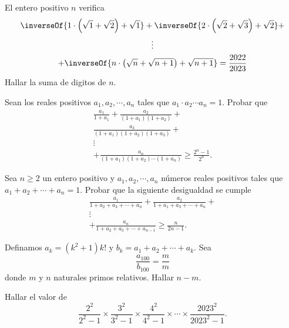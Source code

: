 \begin{section-problem}
    El entero positivo $n$ verifica
    \begin{gather*}
        \inverseOf{1\cdot\left(\sqrt {1} + \sqrt {2}\right) + \sqrt {1}} +
        \inverseOf{2\cdot\left(\sqrt {2} + \sqrt {3}\right) + \sqrt {2}} + \\
        \vdots\\
        + \inverseOf{n\cdot\left(\sqrt {n} + \sqrt {n + 1}\right) + \sqrt {n + 1}} = \frac{2022}{2023}
    \end{gather*}
    Hallar la suma de digitos de $n$.
\end{section-problem}

\begin{section-problem}
    Sean los reales positivos $a_1, a_2, \cdots, a_n$ tales que $a_1 \cdot a_2 \cdots a_n = 1$.
    Probar que
    \begin{gather*}
        \frac{a_1}{1 + a_1} + \frac{a_2}{(1 + a_1)(1 + a_2)} + \\
        \frac{a_3}{(1 + a_1)(1 + a_2)(1 + a_3)} + \\
        \vdots\\
        + \frac{a_n}{(1 + a_1)(1 + a_2)\cdots(1 + a_n)} \geq \frac{2^n - 1}{2^n}.
    \end{gather*}
\end{section-problem}

\begin{section-problem}
    Sea $n\geq 2$ un entero positivo y $a_1, a_2, \cdots, a_n$ números reales positivos tales que $a_1 + a_2 + \cdots + a_n = 1$.
    Probar que la siguiente desigualdad se cumple
    \begin{gather*}
        \frac{a_1}{1 + a_2 + a_3 + \cdots + a_n} + \frac{a_2}{1 + a_1 + a_3 + \cdots + a_n} +\\
        \vdots\\
        + \frac{a_n}{1 + a_2 + a_3 + \cdots + a_{n - 1}} \geq \frac{n}{2n - 1}.
    \end{gather*}
\end{section-problem}

\begin{section-problem}
    Definamos $a_k = (k^2 + 1)k!$ y $b_k = a_1 + a_2 + \cdots + a_k$.
    Sea
    \[\frac{a_{100}}{b_{100}} = \frac{m}{m}\]
    donde $m$ y $n$ naturales primos relativos.
    Hallar $n - m.$
\end{section-problem}

\begin{section-problem}
    Hallar el valor de
    \[\frac{2^2}{2^2 - 1} \times \frac{3^2}{3^2 - 1} \times \frac{4^2}{4^2 - 1} \times \cdots \times \frac{2023^2}{2023^2 - 1}.\]
\end{section-problem}

